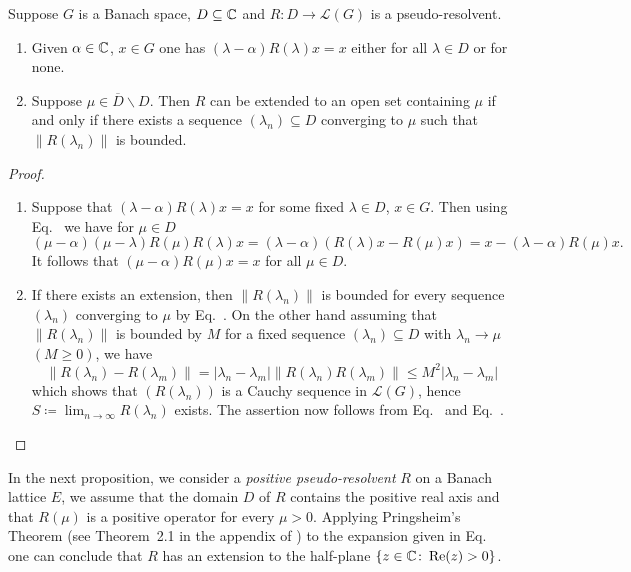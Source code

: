 \begin{proposition}\label{prop:c3-2.6}
	Suppose $G$ is a Banach space, $D \subseteq \mathbb{C} $ and $R \colon D \to \mathcal{L}(G)$ is a pseudo-resolvent.
	
	\begin{enumerate}[\upshape (i)]
		\item Given $\alpha \in \mathbb{C} $, $x \in G$ one has $(\lambda-\alpha)R(\lambda)x = x$ either for all $\lambda \in D$ or for none.
		
		\item Suppose $\mu \in \overline{D}\backslash D$. Then $R$ can be extended to an open set containing $\mu$ if and only if there exists a sequence $(\lambda_{n}) \subseteq D$ converging to $\mu$ such that $\|R(\lambda_{n})\|$ is bounded.
	\end{enumerate}
\end{proposition}
\begin{proof}
	\begin{enumerate}[\upshape (i), wide, labelindent=.25em]
		\item 
        Suppose that $(\lambda-\alpha)R(\lambda)x = x$ for some fixed $\lambda \in D$, $x \in G$.
		Then using Eq.~ we have for $\mu \in D$ 
        \[
        (\mu-\alpha)(\mu-\lambda)R(\mu)R(\lambda)x = (\lambda-\alpha)(R(\lambda)x - R(\mu)x) = x - (\lambda-\alpha)R(\mu)x .
        \]
		It follows that $(\mu-\alpha)R(\mu)x = x$ for all $\mu \in D$.
		
		\item 
        If there exists an extension, then $\|R(\lambda_{n})\|$ is bounded for every sequence $(\lambda_{n})$ converging to $\mu$ by Eq.~.
		On the other hand assuming that $\|R(\lambda_{n})\|$ is bounded by $M$ for a fixed sequence $(\lambda_{n}) \subseteq D$ with $\lambda_{n} \to \mu$ $(M \geq 0)$, we have
		\[
		\|R(\lambda_{n}) - R(\lambda_{m})\| = |\lambda_{n}-\lambda_{m}| \|R(\lambda_{n})R(\lambda_{m})\| \leq M^2|\lambda_{n}-\lambda_{m}|
        \]
        which shows that $(R(\lambda_{n}))$ is a Cauchy sequence in $\mathcal{L}(G)$, hence $S \coloneq \lim_{n\to\infty}R(\lambda_{n})$ exists.
		The assertion now follows from Eq.~ and Eq.~.
		\qedhere
	\end{enumerate}
\end{proof}
In the next proposition, we consider a \emph{positive pseudo-resolvent}
$R$ on a Banach lattice $E$, \ie  we assume that the domain $D$ of\/ $R$ contains the positive real axis and that $R(\mu)$ is a positive operator for every $\mu > 0$.
Applying Pringsheim's Theorem (see Theorem~2.1 in the appendix of \textcite{schaefer:1966}) to the expansion given in Eq.~ one can conclude that $R$ has an extension to the half-plane $\{z \in \mathbb{C}  \colon \mathop{}\!\mathrm{Re}(z) > 0\}$.

